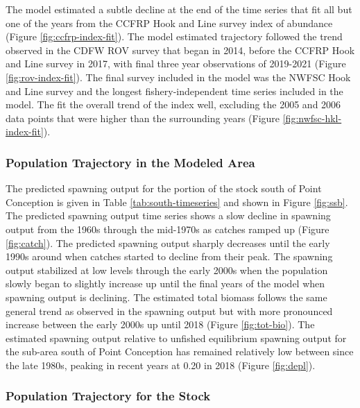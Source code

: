 \documentclass[11pt,
  english,
  letterpaper,
]{article}
\begin{document}
The model estimated a subtle decline at the end of the time series that fit all but one of the years from the CCFRP Hook and Line survey index of abundance (Figure \ref{fig:ccfrp-index-fit}). The model estimated trajectory followed the trend observed in the CDFW ROV survey that began in 2014, before the CCFRP Hook and Line survey in 2017, with final three year observations of 2019-2021 (Figure \ref{fig:rov-index-fit}). The final survey included in the model was the NWFSC Hook and Line survey and the longest fishery-independent time series included in the model. The fit the overall trend of the index well, excluding the 2005 and 2006 data points that were higher than the surrounding years (Figure \ref{fig:nwfsc-hkl-index-fit}).

\hypertarget{population-trajectory-in-the-modeled-area}{%
\subsubsection{Population Trajectory in the Modeled Area}\label{population-trajectory-in-the-modeled-area}}

The predicted spawning output for the portion of the stock south of Point Conception is given in Table \ref{tab:south-timeseries} and shown in Figure \ref{fig:ssb}. The predicted spawning output time series shows a slow decline in spawning output from the 1960s through the mid-1970s as catches ramped up (Figure \ref{fig:catch}). The predicted spawning output sharply decreases until the early 1990s around when catches started to decline from their peak. The spawning output stabilized at low levels through the early 2000s when the population slowly began to slightly increase up until the final years of the model when spawning output is declining. The estimated total biomass follows the same general trend as observed in the spawning output but with more pronounced increase between the early 2000s up until 2018 (Figure \ref{fig:tot-bio}). The estimated spawning output relative to unfished equilibrium spawning output for the sub-area south of Point Conception has remained relatively low between since the late 1980s, peaking in recent years at 0.20 in 2018 (Figure \ref{fig:depl}).

\hypertarget{population-trajectory-for-the-stock}{%
\subsubsection{Population Trajectory for the Stock}\label{population-trajectory-for-the-stock}}
\end{document}
